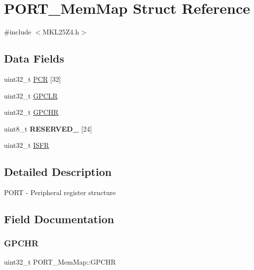 \hypertarget{struct_p_o_r_t___mem_map}{}\section{P\+O\+R\+T\+\_\+\+Mem\+Map Struct Reference}
\label{struct_p_o_r_t___mem_map}


{\ttfamily \#include $<$M\+K\+L25\+Z4.\+h$>$}

\subsection*{Data Fields}
\begin{DoxyCompactItemize}
\item 
uint32\+\_\+t \hyperlink{struct_p_o_r_t___mem_map_a1c54a8f1741fade8daf28198fee43ddd}{P\+CR} \mbox{[}32\mbox{]}
\item 
uint32\+\_\+t \hyperlink{struct_p_o_r_t___mem_map_a837c289643f8cec958b1f01c086b558a}{G\+P\+C\+LR}
\item 
uint32\+\_\+t \hyperlink{struct_p_o_r_t___mem_map_a84f8893cbefd6a3eff18b455f9069b29}{G\+P\+C\+HR}
\item 
\mbox{\label{struct_p_o_r_t___mem_map_ad85e48d2b0e879333bf0dcb5a0af21f5}} 
uint8\+\_\+t {\bfseries R\+E\+S\+E\+R\+V\+E\+D\+\_} \mbox{[}24\mbox{]}
\item 
uint32\+\_\+t \hyperlink{struct_p_o_r_t___mem_map_a53c86a08f430dc915a312efe74ba83e6}{I\+S\+FR}
\end{DoxyCompactItemize}


\subsection{Detailed Description}
P\+O\+RT -\/ Peripheral register structure 

\subsection{Field Documentation}
\mbox{\label{struct_p_o_r_t___mem_map_a84f8893cbefd6a3eff18b455f9069b29}} 
\subsubsection{\texorpdfstring{G\+P\+C\+HR}{GPCHR}}
{\footnotesize\ttfamily uint32\+\_\+t P\+O\+R\+T\+\_\+\+Mem\+Map\+::\+G\+P\+C\+HR}

